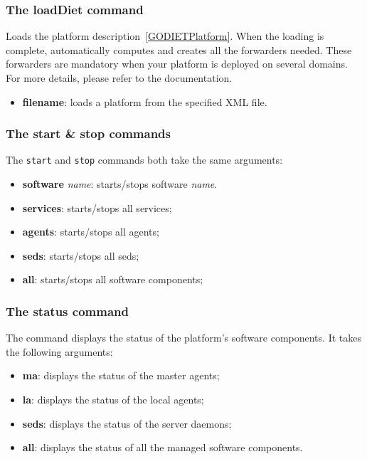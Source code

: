 \subsubsection{The loadDiet command}
Loads the \diet platform description~\ref{GODIETPlatform}. When the loading is complete, \godiet automatically computes and creates all the \diet forwarders needed. These \diet forwarders are mandatory when your platform is deployed on several domains. For more details, please refer to the \diet documentation.

\begin{itemize}
  \item \textbf{filename}: loads a \diet platform from the specified XML file.
\end{itemize}

\subsubsection{The start \& stop commands}
\label{GODIETCommandStartStop}

The \verb+start+ and \verb+stop+ commands both take the same arguments:
\begin{itemize}
 \item \textbf{software} \emph{name}: starts/stops software \emph{name}.
 \item \textbf{services}: starts/stops all services;
 \item \textbf{agents}: starts/stops all agents;
 \item \textbf{seds}: starts/stops all seds;
 \item \textbf{all}: starts/stops all software components;
\end{itemize}

\subsubsection{The status command}

The command displays the status of the \diet platform's software components. It takes the following arguments:
\begin{itemize}
\item \textbf{ma}: displays the status of the master agents;
\item \textbf{la}: displays the status of the local agents;
\item \textbf{seds}: displays the status of the server daemons;
\item \textbf{all}: displays the status of all the managed software components.
\end{itemize}
\vspace{1cm}

